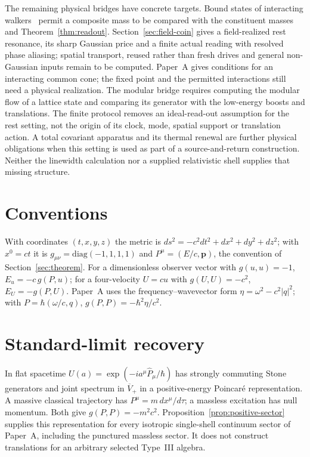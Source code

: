 \documentclass[12pt,a4paper]{article}
\theoremstyle{definition}
\theoremstyle{remark}
\begin{document}
The remaining physical bridges have concrete targets. Bound states of interacting
walkers~\cite{Ahlbrecht2012} permit a composite mass to be compared with the
constituent masses and Theorem~\ref{thm:readout}. Section~\ref{sec:field-coin}
gives a field-realized rest resonance, its sharp Gaussian price and a finite actual reading with resolved phase aliasing;
spatial transport, reused rather than fresh drives and general non-Gaussian
inputs remain to be computed. Paper~A gives conditions for an interacting
common cone; the fixed point and the permitted interactions still need a
physical realization. The modular bridge requires computing the modular flow
of a lattice state and comparing its generator with the low-energy boosts
and translations. The finite protocol removes an ideal-read-out assumption for the rest setting, not the origin of its clock, mode, spatial support or translation action. A total covariant apparatus and its thermal renewal are further physical obligations when this setting is used as part of a source-and-return construction. Neither the linewidth calculation nor a supplied relativistic shell supplies that missing structure.

\appendix
\section{Conventions}
\label{app:conventions}

With coordinates $(t,x,y,z)$ the metric is $ds^2=-c^2dt^2+dx^2+dy^2+dz^2$; with $x^0=ct$ it is $g_{\mu\nu}=\mathrm{diag}(-1,1,1,1)$ and $P^\mu=(E/c,\mathbf p)$, the convention of Section~\ref{sec:theorem}. For a dimensionless observer vector with $g(u,u)=-1$, $E_u=-c\,g(P,u)$; for a four-velocity $U=cu$ with $g(U,U)=-c^2$, $E_U=-g(P,U)$. Paper~A uses the frequency--wavevector form $\eta=\omega^2-c^2|q|^2$; with $P=\hbar(\omega/c,q)$, $g(P,P)=-\hbar^2\eta/c^2$.

\section{Standard-limit recovery}
\label{app:standard-limit}

In flat spacetime $U(a)=\exp(-ia^\mu\hat P_\mu/\hbar)$ has strongly commuting Stone generators and joint spectrum in $\overline V_+$ in a positive-energy Poincar\'e representation. A massive classical trajectory has $P^\mu=m\,dx^\mu/d\tau$; a massless excitation has null momentum. Both give $g(P,P)=-m^2c^2$. Proposition~\ref{prop:positive-sector} supplies this representation for every isotropic single-shell continuum sector of Paper~A, including the punctured massless sector. It does not construct translations for an arbitrary selected Type~III algebra.
\end{document}
